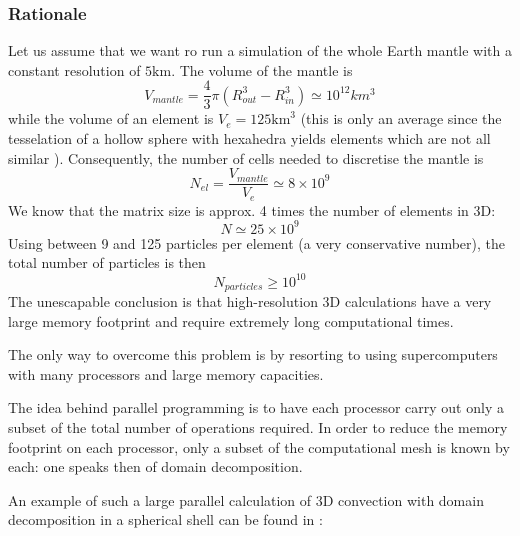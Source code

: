 
\subsubsection{Rationale}

Let us assume that we want ro run a simulation of the whole Earth mantle
with a constant resolution of $5\text{km}$. The volume of the mantle is
\[
V_{mantle}=\frac{4}{3}\pi (R_{out}^3-R_{in}^3) \simeq  10^{12}  km^3
\]
while the volume of an element is $V_{e} = 125 \text{km}^3$ (this is 
only an average since the tesselation of a hollow sphere with 
hexahedra yields elements which are not all similar \cite{thie18}).
Consequently, the number of cells needed to discretise the mantle
is 
\[
N_{el}=\frac{V_{mantle}}{V_{e}}\simeq 8\times 10^9
\]
We know that the matrix size is approx. 4 times the number of elements in 3D:
\[
N\simeq 25 \times 10^9
\]
Using between 9 and 125 particles per element (a very conservative number),
the total number of particles is then
\[
N_{particles}  \geq 10^{10}
\]
The unescapable conclusion is that high-resolution 3D 
calculations 
 have a very large memory footprint and require extremely long computational times.

The only way to overcome this problem is by resorting to 
using supercomputers with many processors and large memory capacities.

The idea behind parallel programming is to have each processor carry out 
only a subset of the total number of operations required. In order to reduce 
the memory footprint on each processor, only a subset of the computational
mesh is known by each: one speaks then of domain decomposition.

An example of such a large parallel calculation of 3D convection with 
domain decomposition in a spherical shell can be found in \cite{krhb12}:

